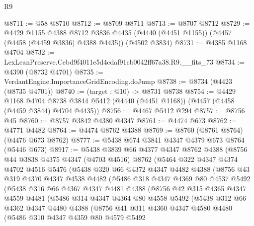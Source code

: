\begin{lexlean}{R9}
\begin{coremodule}
@8711 := @58 @8710
@8712 := @8709 @8711
@8713 := @8707 @8712
@8729 := @4429
    @1155
    @4388
    @8712
    @3836
    @4435
    (@4440 (@4451 @1155))
    (@4457 (@4458 (@4459 @3836) @4388 @4435))
    (@4502 @3834)
@8731 := @4385 @1168 @4704
@8732 := LexLeanPreserve.Cebd9f4011e5d4cdaf91cb0042ff67a38.R9.__fits_73
@8734 := @4390 (@8732 @4701)
@8735 := VerdantEngine.ImportanceGridEncoding.doJump
@8738 := @8734 (@4423 (@8735 @4701))
@8740 := (target : @10) -> @8731 @8738
@8754 := @4429
    @1168
    @4704
    @8738
    @3844
    @5412
    (@4440 (@4451 @1168))
    (@4457 (@4458 (@4459 @3844) @4704 @4435))
@8756 := @4467 @5412 @294
@8757 := @8756 @45
@8760 := @8757 @3842 @4380 @4347
@8761 := @4474 @673
@8762 := @4771 @4482
@8764 := @4474 @8762 @4388
@8769 := @8760 (@8761 @8764) (@4476 @673 @8762)
@8777 := @5438 @674 @3841 @4347 @4379 @673 @8764 (@5446 @673)
@8917 := @5438
    @3839
    @66
    @4377
    @4347
    @8762
    @4388
    (@8756
      @44
      @3838
      @4375
      @4347
      (@4703 @4516)
      @8762
      (@5464
        @322
        @4347
        @4374
        @4702
        @4516
        @5476
        (@5438
          @320
          @66
          @4372
          @4347
          @4482
          @4388
          (@8756
            @43
            @319
            @4370
            @4347
            @4538
            @4482
            (@5486
              @318
              @4347
              @4369
              @80
              @4537
              @5492
              (@5438
                @316
                @66
                @4367
                @4347
                @4481
                @4388
                (@8756
                  @42
                  @315
                  @4365
                  @4347
                  @4559
                  @4481
                  (@5486
                    @314
                    @4347
                    @4364
                    @80
                    @4558
                    @5492
                    (@5438
                      @312
                      @66
                      @4362
                      @4347
                      @4480
                      @4388
                      (@8756
                        @41
                        @311
                        @4360
                        @4347
                        @4580
                        @4480
                        (@5486
                          @310
                          @4347
                          @4359
                          @80
                          @4579
                          @5492

\end{coremodule}
\end{lexlean}
